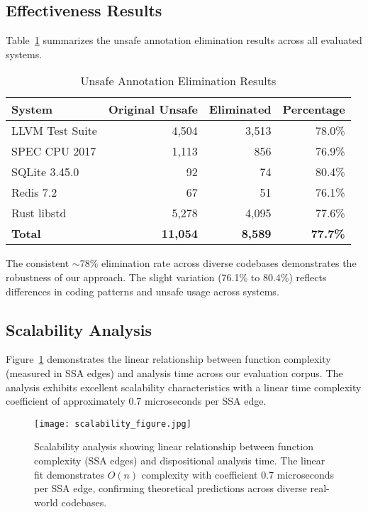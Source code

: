 \documentclass[acmsmall,anonymous,review,screen]{acmart}
\begin{document}
	\subsection{Effectiveness Results}
	
	Table~\ref{tab:effectiveness} summarizes the unsafe annotation elimination results across all evaluated systems.
	
	\begin{table}[t]
		\centering
		\caption{Unsafe Annotation Elimination Results}
		\label{tab:effectiveness}
		\begin{tabular}{lrrr}
			\toprule
			\textbf{System} & \textbf{Original Unsafe} & \textbf{Eliminated} & \textbf{Percentage} \\
			\midrule
			LLVM Test Suite & 4,504 & 3,513 & 78.0\% \\
			SPEC CPU 2017 & 1,113 & 856 & 76.9\% \\
			SQLite 3.45.0 & 92 & 74 & 80.4\% \\
			Redis 7.2 & 67 & 51 & 76.1\% \\
			Rust libstd & 5,278 & 4,095 & 77.6\% \\
			\midrule
			\textbf{Total} & \textbf{11,054} & \textbf{8,589} & \textbf{77.7\%} \\
			\bottomrule
		\end{tabular}
	\end{table}
	
	The consistent $\sim$78\% elimination rate across diverse codebases demonstrates the robustness of our approach. The slight variation (76.1\% to 80.4\%) reflects differences in coding patterns and unsafe usage across systems.
	
	\subsection{Scalability Analysis}
	
	Figure~\ref{fig:scalability} demonstrates the linear relationship between function complexity (measured in SSA edges) and analysis time across our evaluation corpus. The analysis exhibits excellent scalability characteristics with a linear time complexity coefficient of approximately 0.7 microseconds per SSA edge.
	
	\begin{figure}[h!]
		\centering
		\texttt{[image: scalability\_figure.jpg]}
		\caption{Scalability analysis showing linear relationship between function complexity (SSA edges) and dispositional analysis time. The linear fit demonstrates $O(n)$ complexity with coefficient 0.7 microseconds per SSA edge, confirming theoretical predictions across diverse real-world codebases.}
		\label{fig:scalability}
	\end{figure}
	
\end{document}
